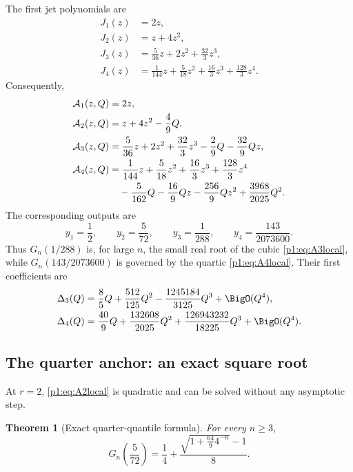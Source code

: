 \documentclass[11pt,oneside]{article}
\numberwithin{equation}{section}
\newtheorem{theorem}{Theorem}[section]
\theoremstyle{definition}
\theoremstyle{remark}
\begin{document}
The first jet polynomials are
\begin{align}
 J_1(z)&=2z,\label{p1:eq:J1}\\
 J_2(z)&=z+4z^2,\label{p1:eq:J2}\\
 J_3(z)&=\frac5{36}z+2z^2+\frac{32}{3}z^3,\label{p1:eq:J3}\\
 J_4(z)&=\frac1{144}z+\frac5{18}z^2+\frac{16}{3}z^3+\frac{128}{3}z^4.
 \label{p1:eq:J4}
\end{align}
Consequently,
\begin{align}
 \mathcal A_1(z,Q)&=2z,\label{p1:eq:A1local}\\
 \mathcal A_2(z,Q)&=z+4z^2-\frac49Q,\label{p1:eq:A2local}\\
 \mathcal A_3(z,Q)&=\frac5{36}z+2z^2+\frac{32}{3}z^3
 -\frac29Q-\frac{32}{9}Qz,\label{p1:eq:A3local}\\
 \mathcal A_4(z,Q)&=\frac1{144}z+\frac5{18}z^2+\frac{16}{3}z^3+\frac{128}{3}z^4
 \notag\\
 &\quad-\frac5{162}Q-\frac{16}{9}Qz-\frac{256}{9}Qz^2
 +\frac{3968}{2025}Q^2.
 \label{p1:eq:A4local}
\end{align}
The corresponding outputs are
\begin{equation}
 y_1=\frac12,
 \qquad y_2=\frac5{72},
 \qquad y_3=\frac1{288},
 \qquad y_4=\frac{143}{2073600}.
 \label{p1:eq:y-first}
\end{equation}
Thus $G_n(1/288)$ is, for large $n$, the small real root of the cubic
\eqref{p1:eq:A3local}, while $G_n(143/2073600)$ is governed by the quartic
\eqref{p1:eq:A4local}.  Their first coefficients are
\begin{align}
 \Delta_3(Q)&=\frac85Q+\frac{512}{125}Q^2
 -\frac{1245184}{3125}Q^3+\BigO(Q^4),
 \label{p1:eq:Delta3}\\
 \Delta_4(Q)&=\frac{40}{9}Q+\frac{132608}{2025}Q^2
 +\frac{126943232}{18225}Q^3+\BigO(Q^4).
 \label{p1:eq:Delta4}
\end{align}

\subsection{The quarter anchor: an exact square root}

At $r=2$, \eqref{p1:eq:A2local} is quadratic and can be solved without any
asymptotic step.

\begin{theorem}[Exact quarter-quantile formula]
\label{p1:thm:quarter-exact}
For every $n\ge3$,
\begin{equation}
 \boxed{
 G_n\!\left(\frac5{72}\right)
 =\frac14+\frac{\sqrt{1+\frac{64}{9}4^{-n}}-1}{8}.}
 \label{p1:eq:quarter-exact}
\end{equation}
\end{theorem}
\end{document}
